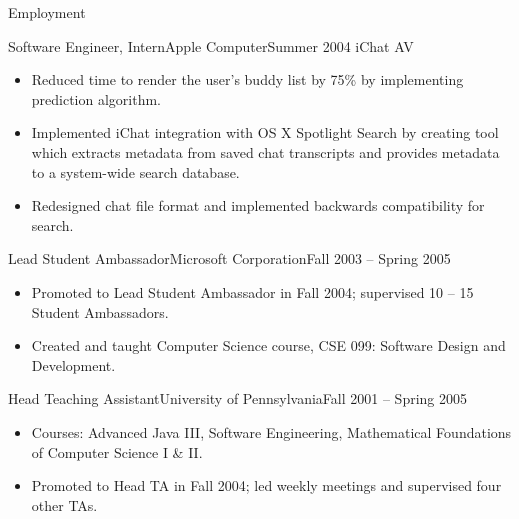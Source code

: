 \documentclass[]{mcdowellcv}
\begin{document}
	\makeheader
	
	\begin{cvsection}{Employment}
		\begin{cvsubsection}{Software Engineer, Intern}{Apple Computer}{Summer 2004}
			iChat AV			
			\begin{itemize}
				\item Reduced time to render the user’s buddy list by 75\% by implementing prediction algorithm.
				\item Implemented iChat integration with OS X Spotlight Search by creating tool which extracts metadata from saved chat transcripts and provides metadata to a system-wide search database.
				\item Redesigned chat file format and implemented backwards compatibility for search.
			\end{itemize}
		\end{cvsubsection}
		
		\begin{cvsubsection}{Lead Student Ambassador}{Microsoft Corporation}{Fall 2003 -- Spring 2005}	
			\begin{itemize}
				\item Promoted to Lead Student Ambassador in Fall 2004; supervised 10 -- 15 Student Ambassadors.
				\item Created and taught Computer Science course, CSE 099: Software Design and Development.
			\end{itemize}
		\end{cvsubsection}
		
		\begin{cvsubsection}{Head Teaching Assistant}{University of Pennsylvania}{Fall 2001 -- Spring 2005}		
			\begin{itemize}
				\item Courses: Advanced Java III, Software Engineering, Mathematical Foundations of Computer Science I \& II.
				\item Promoted to Head TA in Fall 2004; led weekly meetings and supervised four other TAs.
			\end{itemize}
		\end{cvsubsection}
		

\end{cvsection}
\end{document}
